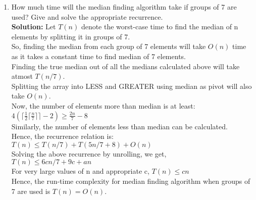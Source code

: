 \documentclass[12pt]{article}
\begin{document}
\begin{enumerate}
\begin{enumerate}
\item How much time will the median finding algorithm take if groups of 7 are used? Give and solve the appropriate recurrence.\\
\textbf{Solution:} Let $T(n)$ denote the worst-case time to find the median of n elements by splitting it in groups of 7.\\
So, finding the median from each group of 7 elements will take $O(n)$ time as it takes a constant time to find median of 7 elements.\\
Finding the true median out of all the medians calculated above will take atmost $T(n/7)$.\\
Splitting the array into LESS and GREATER using median as pivot will also take $O(n)$.\\
Now, the number of elements more than median is at least:\\
$\displaystyle{4(\lceil \frac{1}{2}\lceil \frac{n}{7}\rceil\rceil - 2) \geq \frac{2n}{7} - 8}$\\
Similarly, the number of elements less than median can be calculated.\\
Hence, the recurrence relation is:\\
$T(n) \leq T(n/7) + T(5n/7 + 8) + O(n)$\\
Solving the above recurrence by unrolling, we get,\\
$T (n) \leq 6cn/7 + 9c + an$\\
For very large values of n and appropriate c, $T(n) \leq cn$\\
Hence, the run-time complexity for median finding algorithm when groups of 7 are used is $T(n) = O(n)$.\\


\end{enumerate}
\end{enumerate}
\end{document}
